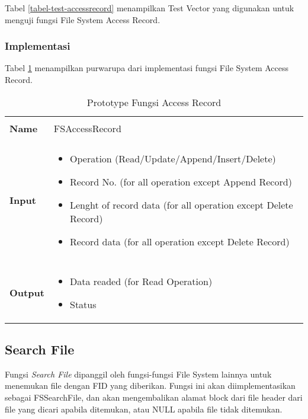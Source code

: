 Tabel \ref{tabel-test-accessrecord} menampilkan Test Vector yang digunakan untuk menguji fungsi File System Access Record.

\subsubsection{Implementasi}

Tabel \ref{tabel-accessrecord} menampilkan purwarupa dari implementasi fungsi File System Access Record.

\begin{table}[h]
  \centering
  \begin{tabular}{p{2cm} p{8cm}}
    \hline\\
    {\bf Name} & FSAccessRecord\\
    \hline\\
    {\bf Input} & 
    \begin{itemize}[noitemsep,topsep=0pt,parsep=0pt,partopsep=0pt]
    \item Operation (Read/Update/Append/Insert/Delete)
    \item Record No. (for all operation except Append Record)
    \item Lenght of record data (for all operation except Delete Record)
    \item Record data (for all operation except Delete Record)
    \end{itemize}
    \\
    \hline\\
    {\bf Output} & 
    \begin{itemize}[noitemsep,topsep=0pt,parsep=0pt,partopsep=0pt]
    \item Data readed (for Read Operation)
    \item Status
    \end{itemize}
    \\
    \hline
  \end{tabular}
  \caption{Prototype Fungsi Access Record}
  \label{tabel-accessrecord}
\end{table}

\subsection{Search File}

Fungsi {\em Search File} dipanggil oleh fungsi-fungsi File System lainnya untuk menemukan file dengan FID yang diberikan. Fungsi ini akan diimplementasikan sebagai FSSearchFile, dan akan mengembalikan alamat block dari file header dari file yang dicari apabila ditemukan, atau NULL apabila file tidak ditemukan.


